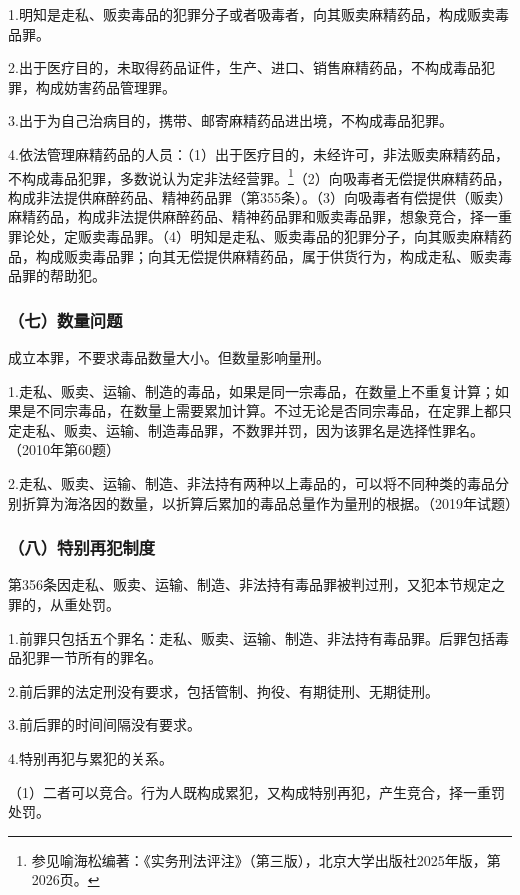 1.明知是走私、贩卖毒品的犯罪分子或者吸毒者，向其贩卖麻精药品，构成贩卖毒品罪。

2.出于医疗目的，未取得药品证件，生产、进口、销售麻精药品，不构成毒品犯罪，构成妨害药品管理罪。

3.出于为自己治病目的，携带、邮寄麻精药品进出境，不构成毒品犯罪。

4.依法管理麻精药品的人员：（1）出于医疗目的，未经许可，非法贩卖麻精药品，不构成毒品犯罪，多数说认为定非法经营罪。\footnote{参见喻海松编著：《实务刑法评注》（第三版），北京大学出版社2025年版，第2026页。}（2）向吸毒者无偿提供麻精药品，构成非法提供麻醉药品、精神药品罪（第355条）。（3）向吸毒者有偿提供（贩卖）麻精药品，构成非法提供麻醉药品、精神药品罪和贩卖毒品罪，想象竞合，择一重罪论处，定贩卖毒品罪。（4）明知是走私、贩卖毒品的犯罪分子，向其贩卖麻精药品，构成贩卖毒品罪；向其无偿提供麻精药品，属于供货行为，构成走私、贩卖毒品罪的帮助犯。

\subsubsection*{（七）数量问题}

成立本罪，不要求毒品数量大小。但数量影响量刑。

1.走私、贩卖、运输、制造的毒品，如果是同一宗毒品，在数量上不重复计算；如果是不同宗毒品，在数量上需要累加计算。不过无论是否同宗毒品，在定罪上都只定走私、贩卖、运输、制造毒品罪，不数罪并罚，因为该罪名是选择性罪名。（2010年第60题）

2.走私、贩卖、运输、制造、非法持有两种以上毒品的，可以将不同种类的毒品分别折算为海洛因的数量，以折算后累加的毒品总量作为量刑的根据。（2019年试题）

\subsubsection*{（八）特别再犯制度}

第356条因走私、贩卖、运输、制造、非法持有毒品罪被判过刑，又犯本节规定之罪的，从重处罚。

1.前罪只包括五个罪名：走私、贩卖、运输、制造、非法持有毒品罪。后罪包括毒品犯罪一节所有的罪名。

2.前后罪的法定刑没有要求，包括管制、拘役、有期徒刑、无期徒刑。

3.前后罪的时间间隔没有要求。

4.特别再犯与累犯的关系。

（1）二者可以竞合。行为人既构成累犯，又构成特别再犯，产生竞合，择一重罚处罚。

